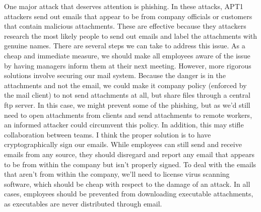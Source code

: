 \documentclass[psamsfonts]{amsart}
\begin{document}
One major attack that deserves attention is phishing. In these attacks, APT1 attackers send out emails that appear to be from company officials or customers that contain malicious attachments. These are effective because they attackers research the most likely people to send out emails and label the attachments with genuine names. There are several steps we can take to address this issue. As a cheap and immediate measure, we should make all employees aware of the issue by having managers inform them at their next meeting. However, more rigorous solutions involve securing our mail system. Because the danger is in the attachments and not the email, we could make it company policy (enforced by the mail client) to not send attachments at all, but share files through a central ftp server. In this case, we might prevent some of the phishing, but as we'd still need to open attachments from clients and send attachments to remote workers, an informed attacker could circumvent this policy. In addition, this may stifle collaboration between teams. I think the proper solution is to have cryptographically sign our emails. While employees can still send and receive emails from any source, they should disregard and report any email that appears to be from within the company but isn't properly signed. To deal with the emails that aren't from within the company, we'll need to license virus scanning software, which should be cheap with respect to the damage of an attack. In all cases, employees should be prevented from downloading executable attachments, as executables are never distributed through email.
\end{document}
